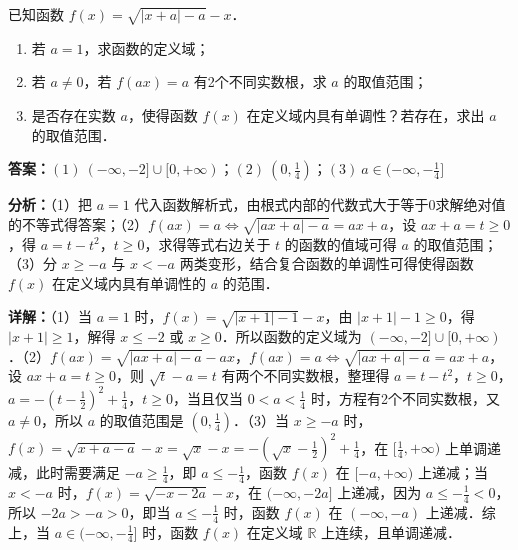 \begin{question}[points=16]
已知函数 $f(x)=\sqrt{|x+a|-a}-x$．\begin{enumerate}\item[(1)] 若 $a=1$，求函数的定义域；\item[(2)] 若 $a\neq 0$，若 $f(ax)=a$ 有2个不同实数根，求 $a$ 的取值范围；\item[(3)] 是否存在实数 $a$，使得函数 $f(x)$ 在定义域内具有单调性？若存在，求出 $a$ 的取值范围．\end{enumerate}
\begin{solution}
\textbf{答案：}$(1)\ (-\infty,-2]\cup[0,+\infty)$；$(2)\ (0,\frac{1}{4})$；$(3)\ a\in(-\infty,-\frac{1}{4}]$

\textbf{分析：}（1）把 $a=1$ 代入函数解析式，由根式内部的代数式大于等于0求解绝对值的不等式得答案；\newline（2）$f(ax)=a\Leftrightarrow\sqrt{|ax+a|-a}=ax+a$，设 $ax+a=t\ge 0$，得 $a=t-t^2$，$t\ge 0$，求得等式右边关于 $t$ 的函数的值域可得 $a$ 的取值范围；\newline（3）分 $x\ge -a$ 与 $x<-a$ 两类变形，结合复合函数的单调性可得使得函数 $f(x)$ 在定义域内具有单调性的 $a$ 的范围．

\textbf{详解：}（1）当 $a=1$ 时，$f(x)=\sqrt{|x+1|-1}-x$，由 $|x+1|-1\ge 0$，得 $|x+1|\ge 1$，解得 $x\le -2$ 或 $x\ge 0$．所以函数的定义域为 $(-\infty,-2]\cup[0,+\infty)$．\newline（2）$f(ax)=\sqrt{|ax+a|-a}-ax$，$f(ax)=a\Leftrightarrow\sqrt{|ax+a|-a}=ax+a$，设 $ax+a=t\ge 0$，则 $\sqrt{t}-a=t$ 有两个不同实数根，整理得 $a=t-t^2$，$t\ge 0$，$a=-(t-\frac{1}{2})^2+\frac{1}{4}$，$t\ge 0$，当且仅当 $0<a<\frac{1}{4}$ 时，方程有2个不同实数根，又 $a\neq 0$，所以 $a$ 的取值范围是 $(0,\frac{1}{4})$．\newline（3）当 $x\ge -a$ 时，$f(x)=\sqrt{x+a-a}-x=\sqrt{x}-x=-(\sqrt{x}-\frac{1}{2})^2+\frac{1}{4}$，在 $[\frac{1}{4},+\infty)$ 上单调递减，此时需要满足 $-a\ge \frac{1}{4}$，即 $a\le -\frac{1}{4}$，函数 $f(x)$ 在 $[-a,+\infty)$ 上递减；当 $x<-a$ 时，$f(x)=\sqrt{-x-2a}-x$，在 $(-\infty,-2a]$ 上递减，因为 $a\le -\frac{1}{4}<0$，所以 $-2a>-a>0$，即当 $a\le -\frac{1}{4}$ 时，函数 $f(x)$ 在 $(-\infty,-a)$ 上递减．综上，当 $a\in(-\infty,-\frac{1}{4}]$ 时，函数 $f(x)$ 在定义域 $\mathbb{R}$ 上连续，且单调递减．
\end{solution}
\end{question}

